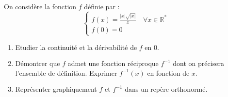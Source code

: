 %
      \begin{exo}
\label{exo:fn recip racine}
            On consid\`ere la fonction $f$ d\'efinie par :
                  \[
                        \left\lbrace
                              \begin{array}{l}
                                    f(x) = \frac{|x| \sqrt{|x|}}{x} \quad \forall x \in \mathbb{R}^*\\
                                    f(0) = 0
                              \end{array}
                        \right.
                  \]
            \begin{enumerate}
                  \item Etudier la continuit\'e et la d\'erivabilit\'e de $f$ en $0$.
                  \item D\'emontrer que $f$ admet une fonction r\'eciproque $f^{-1}$ 
                        dont on pr\'ecisera l'ensemble de d\'efinition.
                        Exprimer $f^{-1} (x)$ en fonction de $x$.
                  \item Repr\'esenter graphiquement $f$ et $f^{-1}$ dans un rep\`ere orthonorm\'e.
            \end{enumerate}
      \end{exo}
%
